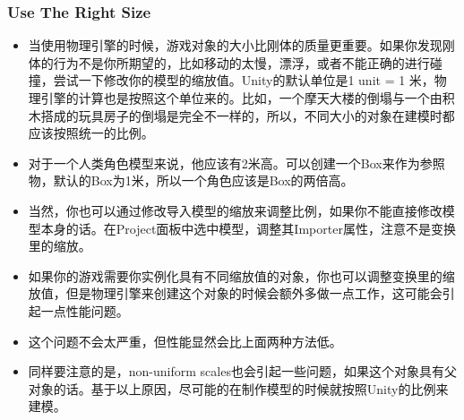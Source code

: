 \documentclass[9pt, b5paper]{article}
\begin{document}
\subsubsection{Use The Right Size}
\label{sec:orgb7a1dc9}
\begin{itemize}
\item 当使用物理引擎的时候，游戏对象的大小比刚体的质量更重要。如果你发现刚体的行为不是你所期望的，比如移动的太慢，漂浮，或者不能正确的进行碰撞，尝试一下修改你的模型的缩放值。Unity的默认单位是1 unit = 1 米，物理引擎的计算也是按照这个单位来的。比如，一个摩天大楼的倒塌与一个由积木搭成的玩具房子的倒塌是完全不一样的，所以，不同大小的对象在建模时都应该按照统一的比例。
\item 对于一个人类角色模型来说，他应该有2米高。可以创建一个Box来作为参照物，默认的Box为1米，所以一个角色应该是Box的两倍高。
\item 当然，你也可以通过修改导入模型的缩放来调整比例，如果你不能直接修改模型本身的话。在Project面板中选中模型，调整其Importer属性，注意不是变换里的缩放。
\item 如果你的游戏需要你实例化具有不同缩放值的对象，你也可以调整变换里的缩放值，但是物理引擎来创建这个对象的时候会额外多做一点工作，这可能会引起一点性能问题。
\item 这个问题不会太严重，但性能显然会比上面两种方法低。
\item 同样要注意的是，non-uniform scales也会引起一些问题，如果这个对象具有父对象的话。基于以上原因，尽可能的在制作模型的时候就按照Unity的比例来建模。
\end{itemize}
\end{document}
